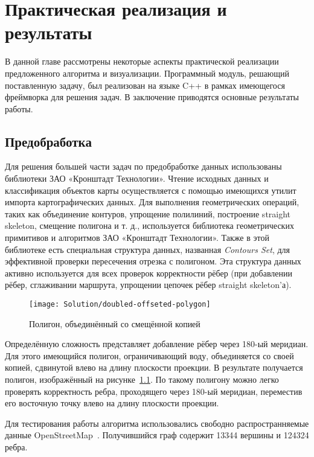 \chapter{Практическая реализация и результаты}

В данной главе рассмотрены некоторые аспекты практической реализации
предложенного алгоритма и визуализации. Программный модуль, решающий
поставленную задачу, был реализован на языке C++ в рамках имеющегося
фреймворка для решения задач. В заключение приводятся основные
результаты работы.

\FloatBarrier

\section{Предобработка}

Для решения большей части задач по предобработке данных использованы
библиотеки ЗАО «Кронштадт Технологии». Чтение исходных данных и
классификация объектов карты осуществляется с помощью имеющихся утилит
импорта картографических данных. Для выполнения геометрических
операций, таких как объединение контуров, упрощение полилиний,
построение straight skeleton, смещение полигона и т. д., используется
библиотека геометрических примитивов и алгоритмов ЗАО «Кронштадт
Технологии». Также в этой библиотеке есть специальная структура
данных, названная \emph{Contours Set}, для эффективной проверки
пересечения отрезка с полигоном. Эта структура данных активно
используется для всех проверок корректности рёбер (при добавлении
рёбер, сглаживании маршрута, упрощении цепочек рёбер straight
skeleton'а).

\begin{figure}
    \texttt{[image: Solution/doubled-offseted-polygon]}
    \caption{Полигон, объединённый со смещённой копией}
    \label{fig:doubled-polygon}
\end{figure}

Определённую сложность представляет добавление рёбер через 180-ый
меридиан. Для этого имеющийся полигон, ограничивающий воду,
объединяется со своей копией, сдвинутой влево на длину плоскости
проекции. В результате получается полигон, изображённый на
рисунке~\ref{fig:doubled-polygon}. По такому полигону можно легко
проверять корректность ребра, проходящего через 180-ый меридиан,
переместив его восточную точку влево на длину плоскости проекции.

Для тестирования работы алгоритма использовались свободно
распространняемые данные OpenStreetMap~\cite{osm}. Получившийся граф
содержит 13344 вершины и 124324 ребра.

